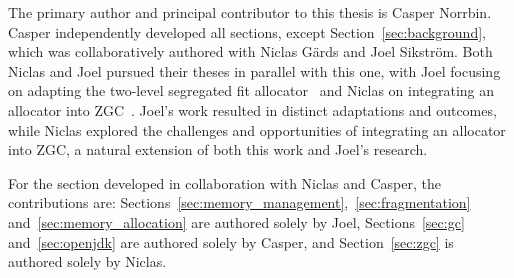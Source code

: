 The primary author and principal contributor to this thesis is Casper Norrbin. Casper independently developed all sections, except Section~\ref{sec:background}, which was collaboratively authored with Niclas Gärds and Joel Sikström. Both Niclas and Joel pursued their theses in parallel with this one, with Joel focusing on adapting the two-level segregated fit allocator~\cite{joel} and Niclas on integrating an allocator into ZGC~\cite{niclas}. Joel's work resulted in distinct adaptations and outcomes, while Niclas explored the challenges and opportunities of integrating an allocator into ZGC, a natural extension of both this work and Joel's research.

For the section developed in collaboration with Niclas and Casper, the contributions are: Sections~\ref{sec:memory_management},~\ref{sec:fragmentation} and~\ref{sec:memory_allocation} are authored solely by Joel, Sections~\ref{sec:gc} and~\ref{sec:openjdk} are authored solely by Casper, and Section~\ref{sec:zgc} is authored solely by Niclas.


